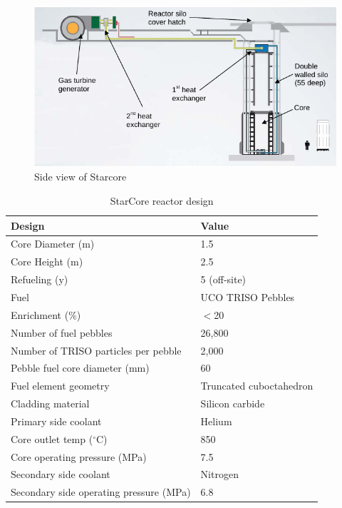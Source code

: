 \begin{figure}[htbp]
\centering
\includegraphics[scale=0.7]{Figs/starcoreview.jpeg}
\caption{Side view of Starcore}
\label{Starview}
\end{figure}

\begin{table} [ht]
\begin{center}

\caption{ StarCore reactor design}
\label{startable}
\begin{tabular}{l l}
\hline 
Design 		&Value \\ 
\hline 
Core Diameter (m) 		&1.5 \\ 
Core Height (m) 		&2.5 \\ 
Refueling (y)		&  5 (off-site)\\ 
Fuel		&UCO TRISO Pebbles \\ 
Enrichment (\%)		&$<$20 \\ 
Number of fuel pebbles		&26,800 \\ 
Number of TRISO particles per pebble		&2,000 \\ 
Pebble fuel core diameter (mm)		&60 \\ 
Fuel element geometry & Truncated cuboctahedron\\ 
Cladding material & Silicon carbide \\ 
Primary side coolant 	&Helium \\ 
Core outlet temp ($^\circ{}$C) 	&850 \\ 
Core operating pressure (MPa)	&7.5 \\ 
Secondary side coolant	&Nitrogen \\ 
Secondary side operating pressure (MPa)	&6.8 \\ 
\hline 

\end{tabular}
\end{center}
\end{table}

